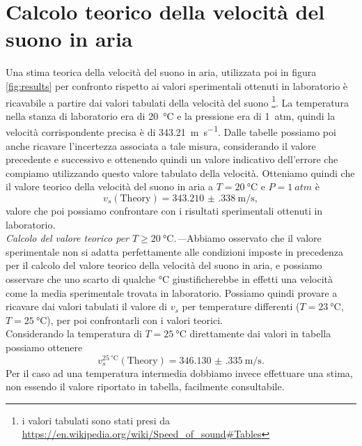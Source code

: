 \documentclass[
    prl,
    reprint, 
    superscriptaddress, 
    altaffilletter, 
    amsmath, 
    amssymb, 
    a4paper,
    varvw]{revtex4-2}
\begin{document}
\appendix

\section{Calcolo teorico della velocità del suono in aria}\label{sec:appendix_A}
Una stima teorica della velocità del suono in aria, utilizzata poi in figura \ref{fig:results} per confronto rispetto ai valori sperimentali ottenuti in laboratorio è ricavabile a partire dai valori tabulati della velocità del suono \footnote{i valori tabulati sono stati presi da \url{https://en.wikipedia.org/wiki/Speed_of_sound\#Tables}}. La temperatura nella stanza di laboratorio era di \SI{20}{\celsius} e la pressione era di \SI{1}{atm}, quindi la velocità corrispondente precisa è di \SI{343.21}{\metre\per\second}. Dalle tabelle possiamo poi anche ricavare l'incertezza associata a tale misura, considerando il valore precedente e successivo e ottenendo quindi un valore indicativo dell'errore che compiamo utilizzando questo valore tabulato della velocità. Otteniamo quindi che il valore teorico della velocità del suono in aria a $T=\SI{20}{\celsius}$ e $P=\SI{1}{atm}$ è \[v_s(\text{Theory}) = \SI{343.210(338)}{\metre\per\second},\] valore che poi possiamo confrontare con i risultati sperimentali ottenuti in laboratorio. \\
\textit{Calcolo del valore teorico per $T \geq \SI{20}{\celsius}$.---}Abbiamo osservato che il valore sperimentale non si adatta perfettamente alle condizioni imposte in precedenza per il calcolo del valore teorico della velocità del suono in aria, e possiamo osservare che uno scarto di qualche \si[]{\celsius} giustificherebbe in effetti una velocità come la media sperimentale trovata in laboratorio. Possiamo quindi provare a ricavare dai valori tabulati il valore di $v_s$ per temperature differenti ($T=\SI{23}{\celsius}$, $T=\SI{25}{\celsius}$), per poi confrontarli con i valori teorici. \\
Considerando la temperatura di $T=\SI{25}{\celsius}$ direttamente dai valori in tabella possiamo ottenere \[v_s^{\SI{25}{\celsius}}(\text{Theory})=\SI{346.130(335)}{\metre\per\second}.\] 
Per il caso ad una temperatura intermedia dobbiamo invece effettuare una stima, non essendo il valore riportato in tabella, facilmente consultabile. 
\end{document}
